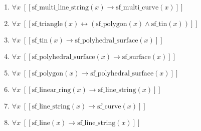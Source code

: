 \documentclass{article}
\begin{document}
\begin{enumerate}
\item $\forall x\;  \left[ \left[ \textrm{sf\_multi\_line\_string}(x) \rightarrow \textrm{sf\_multi\_curve}(x) \right] \right]$
\item $\forall x\;  \left[ \left[ \textrm{sf\_triangle}(x) \leftrightarrow \left(\textrm{sf\_polygon}(x) \land \textrm{sf\_tin}(x)\right) \right] \right]$
\item $\forall x\;  \left[ \left[ \textrm{sf\_tin}(x) \rightarrow \textrm{sf\_polyhedral\_surface}(x) \right] \right]$
\item $\forall x\;  \left[ \left[ \textrm{sf\_polyhedral\_surface}(x) \rightarrow \textrm{sf\_surface}(x) \right] \right]$
\item $\forall x\;  \left[ \left[ \textrm{sf\_polygon}(x) \rightarrow \textrm{sf\_polyhedral\_surface}(x) \right] \right]$
\item $\forall x\;  \left[ \left[ \textrm{sf\_linear\_ring}(x) \rightarrow \textrm{sf\_line\_string}(x) \right] \right]$
\item $\forall x\;  \left[ \left[ \textrm{sf\_line\_string}(x) \rightarrow \textrm{sf\_curve}(x) \right] \right]$
\item $\forall x\;  \left[ \left[ \textrm{sf\_line}(x) \rightarrow \textrm{sf\_line\_string}(x) \right] \right]$
\end{enumerate}
\end{document}
